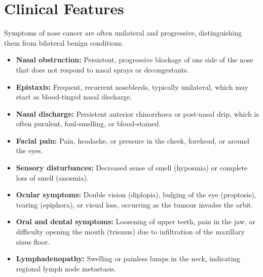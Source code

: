 \section*{Clinical Features}
Symptoms of nose cancer are often unilateral and progressive, distinguishing them from bilateral benign conditions.
\begin{itemize}
    \item \textbf{Nasal obstruction:} Persistent, progressive blockage of one side of the nose that does not respond to nasal sprays or decongestants.
    \item \textbf{Epistaxis:} Frequent, recurrent nosebleeds, typically unilateral, which may start as blood-tinged nasal discharge.
    \item \textbf{Nasal discharge:} Persistent anterior rhinorrhoea or post-nasal drip, which is often purulent, foul-smelling, or blood-stained.
    \item \textbf{Facial pain:} Pain, headache, or pressure in the cheek, forehead, or around the eyes.
    \item \textbf{Sensory disturbances:} Decreased sense of smell (hyposmia) or complete loss of smell (anosmia).
    \item \textbf{Ocular symptoms:} Double vision (diplopia), bulging of the eye (proptosis), tearing (epiphora), or visual loss, occurring as the tumour invades the orbit.
    \item \textbf{Oral and dental symptoms:} Loosening of upper teeth, pain in the jaw, or difficulty opening the mouth (trismus) due to infiltration of the maxillary sinus floor.
    \item \textbf{Lymphadenopathy:} Swelling or painless lumps in the neck, indicating regional lymph node metastasis.
\end{itemize}

